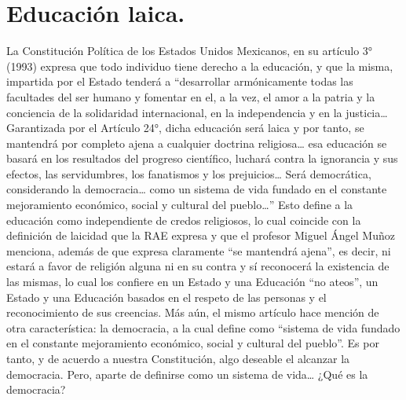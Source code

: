 \section{Educación laica.}
La Constitución Política de los Estados Unidos Mexicanos, en su artículo 3° (1993) expresa que todo individuo tiene derecho a la educación, y que la misma, impartida por el Estado tenderá a “desarrollar armónicamente todas las facultades del ser humano y fomentar en el, a la vez, el amor a la patria y la conciencia de la solidaridad internacional, en la independencia y en la justicia… Garantizada por el Artículo 24°, dicha educación será laica y por tanto, se mantendrá por completo ajena a cualquier doctrina religiosa… esa educación se basará en los resultados del progreso científico, luchará contra la ignorancia y sus efectos, las servidumbres, los fanatismos y los prejuicios… Será democrática, considerando la democracia… como un sistema de vida fundado en el constante mejoramiento económico, social y cultural del pueblo…” Esto define a la educación como independiente de credos religiosos, lo cual coincide con la definición de laicidad que la RAE expresa y que el profesor Miguel Ángel Muñoz menciona, además de que expresa claramente “se mantendrá ajena”, es decir, ni estará a favor de religión alguna ni en su contra y sí reconocerá la existencia de las mismas, lo cual los confiere en un Estado y una Educación “no ateos”, un Estado y una Educación basados en el respeto de las personas y el reconocimiento de sus creencias. Más aún, el mismo artículo hace mención de otra característica: la democracia, a la cual define como “sistema de vida fundado en el constante mejoramiento económico, social y cultural del pueblo”. Es por tanto, y de acuerdo a nuestra Constitución, algo deseable el alcanzar la democracia. Pero, aparte de definirse como un sistema de vida… ¿Qué es la democracia?

